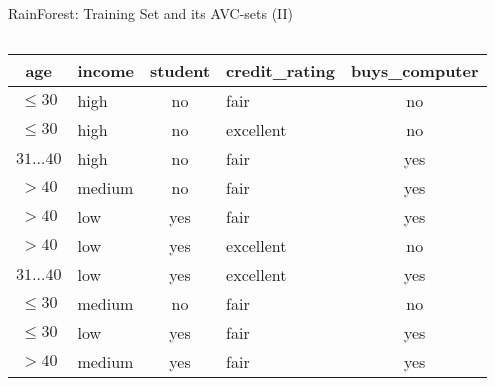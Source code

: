 \begin{frame}{RainForest: Training Set and its AVC-sets (II)}
	\begin{columns}
		\begin{column}{0.6\textwidth}
			\begin{tabular}{|c|l|c|l|c|}
				\hline
				\cellcolor{blue!20}age            & \cellcolor{blue!20}income   & \cellcolor{blue!20}student & \cellcolor{blue!20}credit\_rating & \cellcolor{brown!20}buys\_computer \\\hline
				\cellcolor{yellow!20}$\leq30$     & \cellcolor{yellow!20}high   & \cellcolor{yellow!20}no    & \cellcolor{yellow!20}fair         & \cellcolor{red!20}no               \\\hline
				\cellcolor{yellow!20}$\leq30$     & \cellcolor{yellow!20}high   & \cellcolor{yellow!20}no    & \cellcolor{yellow!20}excellent    & \cellcolor{red!20}no               \\\hline
				\cellcolor{yellow!20}$31\ldots40$ & \cellcolor{yellow!20}high   & \cellcolor{yellow!20}no    & \cellcolor{yellow!20}fair         & \cellcolor{green!20}yes            \\\hline
				\cellcolor{yellow!20}$>40$        & \cellcolor{yellow!20}medium & \cellcolor{yellow!20}no    & \cellcolor{yellow!20}fair         & \cellcolor{green!20}yes            \\\hline
				\cellcolor{yellow!20}$>40$        & \cellcolor{yellow!20}low    & \cellcolor{yellow!20}yes   & \cellcolor{yellow!20}fair         & \cellcolor{green!20}yes            \\\hline
				\cellcolor{yellow!20}$>40$        & \cellcolor{yellow!20}low    & \cellcolor{yellow!20}yes   & \cellcolor{yellow!20}excellent    & \cellcolor{red!20}no               \\\hline
				\cellcolor{yellow!20}$31\ldots40$ & \cellcolor{yellow!20}low    & \cellcolor{yellow!20}yes   & \cellcolor{yellow!20}excellent    & \cellcolor{green!20}yes            \\\hline
				\cellcolor{yellow!20}$\leq30$     & \cellcolor{yellow!20}medium & \cellcolor{yellow!20}no    & \cellcolor{yellow!20}fair         & \cellcolor{red!20}no               \\\hline
				\cellcolor{yellow!20}$\leq30$     & \cellcolor{yellow!20}low    & \cellcolor{yellow!20}yes   & \cellcolor{yellow!20}fair         & \cellcolor{green!20}yes            \\\hline
				\cellcolor{yellow!20}$>40$        & \cellcolor{yellow!20}medium & \cellcolor{yellow!20}yes   & \cellcolor{yellow!20}fair         & \cellcolor{green!20}yes            \\\hline

\end{tabular}
\end{column}
\end{columns}
\end{frame}
